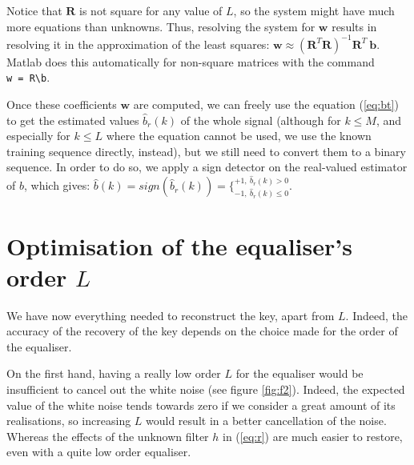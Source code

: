 \documentclass[twocolumn, 12pt]{IEEEtran}
\begin{document}
Notice that $\bm{R}$ is not square for any value of $L$, so the system might have much more equations than unknowns. Thus, resolving the system for $\bm{w}$ results in resolving it in the approximation of the least squares: $\bm{w} \approx (\bm{R}^{T}\bm{R})^{-1}\bm{R}^{T}~\bm{b}$. Matlab does this automatically for non-square matrices with the command \texttt{w~=~R\textbackslash b}.

Once these coefficients $\bm{w}$ are computed, we can freely use the equation (\ref{eq:bt}) to get the estimated values $\hat{b}_{r}(k)$ of the whole signal (although for $k \leq M$, and especially for $k \leq L$ where the equation cannot be used, we use the known training sequence directly, instead), but we still need to convert them to a binary sequence. In order to do so, we apply a sign detector on the real-valued estimator of $b$, which gives: $\hat{b}(k) = sign(\hat{b}_{r}(k)) = \{_{-1,~\hat{b}_{r}(k) \leq 0}^{+1,~\hat{b}_{r}(k) > 0}$.

\section{Optimisation of the equaliser's order $L$}
We have now everything needed to reconstruct the key, apart from $L$. Indeed, the accuracy of the recovery of the key depends on the choice made for the order of the equaliser.

On the first hand, having a really low order $L$ for the equaliser would be insufficient to cancel out the white noise (see figure \ref{fig:f2}). Indeed, the expected value of the white noise tends towards zero if we consider a great amount of its realisations, so increasing $L$ would result in a better cancellation of the noise. Whereas the effects of the unknown filter $h$ in (\ref{eq:r}) are much easier to restore, even with a quite low order equaliser.
\end{document}
